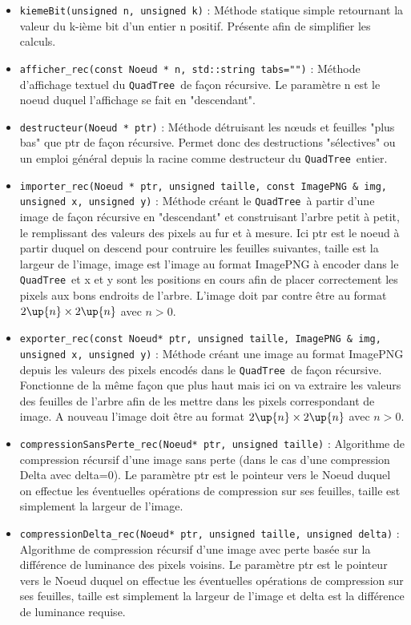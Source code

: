\documentclass{article}
\newcommand{\info}{\texttt}
\newcommand{\qt}{\info{QuadTree}}
\begin{document}
	    \begin{itemize}
	    	\item \info{kiemeBit(unsigned n, unsigned k)} : Méthode statique simple retournant la valeur du k-ième bit d'un entier n positif. Présente afin de simplifier les calculs.
	    	\item \info{afficher\_rec(const Noeud * n, std::string tabs="")} : Méthode d'affichage textuel du \qt\ de façon récursive. Le paramètre n est le noeud duquel l'affichage se fait en "descendant".
	    	\item \info{destructeur(Noeud * ptr)} : Méthode détruisant les nœuds et feuilles "plus bas" que ptr de façon récursive. Permet donc des destructions "sélectives" ou un emploi général depuis la racine comme destructeur du \qt\ entier.
	    	\item \info{importer\_rec(Noeud * ptr, unsigned taille, const ImagePNG \& img, unsigned x, unsigned y)} : Méthode créant le \qt\ à partir d'une image de façon récursive en "descendant" et construisant l'arbre petit à petit, le remplissant des valeurs des pixels au fur et à mesure. Ici ptr est le noeud à partir duquel on descend pour contruire les feuilles suivantes, taille est la largeur de l'image, image est l'image au format ImagePNG à encoder dans le \qt\ et x et y sont les positions en cours afin de placer correctement les pixels aux bons endroits de l'arbre. L'image doit par contre être au format $2\up{n}\times2\up{n}$ avec $n>0$.
	    	\item \info{exporter\_rec(const Noeud* ptr, unsigned taille, ImagePNG \& img, unsigned x, unsigned y)} : Méthode créant une image au format ImagePNG depuis les valeurs des pixels encodés dans le \qt\ de façon récursive. Fonctionne de la même façon que plus haut mais ici on va extraire les valeurs des feuilles de l'arbre afin de les mettre dans les pixels correspondant de image. A nouveau l'image doit être au format $2\up{n}\times2\up{n}$ avec $n>0$.
	    	\item \info{compressionSansPerte\_rec(Noeud* ptr, unsigned taille)} : Algorithme de compression récursif d'une image sans perte (dans le cas d'une compression Delta avec delta=0). Le paramètre ptr est le pointeur vers le Noeud duquel on effectue les éventuelles opérations de compression sur ses feuilles, taille est simplement la largeur de l'image.
	    	\item \info{compressionDelta\_rec(Noeud* ptr, unsigned taille, unsigned delta)} : Algorithme de compression récursif d'une image avec perte basée sur la différence de luminance des pixels voisins. Le paramètre ptr est le pointeur vers le Noeud duquel on effectue les éventuelles opérations de compression sur ses feuilles, taille est simplement la largeur de l'image et delta est la différence de luminance requise.

\end{itemize}
\end{document}
